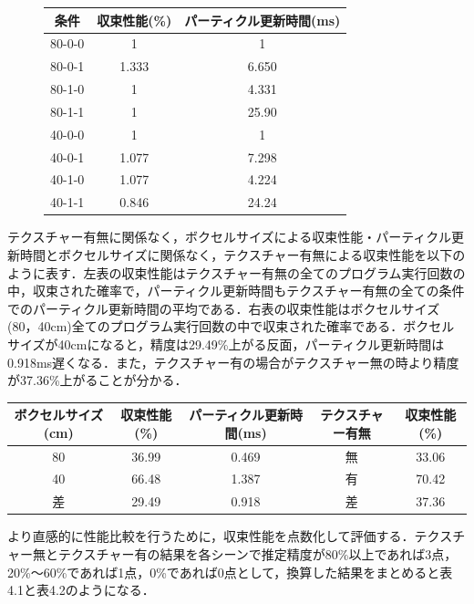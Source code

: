 %
\begin{figure}[htbp]
\begin{center}
\begin{tabular}{ccc} \hline
条件 & 収束性能(\%) &  パーティクル更新時間(ms)\\ \hline \hline
80-0-0 & 1 & 1\\ \hline
80-0-1 & 1.333 & 6.650\\ \hline
80-1-0 & 1 & 4.331\\ \hline
80-1-1 & 1 & 25.90\\ \hline \hline
40-0-0 & 1 & 1\\ \hline
40-0-1 & 1.077 & 7.298\\ \hline
40-1-0 & 1.077 & 4.224\\ \hline
40-1-1 & 0.846 & 24.24\\ \hline
\end{tabular}
\end{center}
\end{figure}
%

テクスチャー有無に関係なく，ボクセルサイズによる収束性能・パーティクル更新時間とボクセルサイズに関係なく，テクスチャー有無による収束性能を以下のように表す．左表の収束性能はテクスチャー有無の全てのプログラム実行回数の中，収束された確率で，パーティクル更新時間もテクスチャー有無の全ての条件でのパーティクル更新時間の平均である．右表の収束性能はボクセルサイズ(80，40cm)全てのプログラム実行回数の中で収束された確率である．ボクセルサイズが40cmになると，精度は29.49\%上がる反面，パーティクル更新時間は0.918ms遅くなる．また，テクスチャー有の場合がテクスチャー無の時より精度が37.36\%上がることが分かる．

\begin{table}[htbp]
\begin{center}
\begin{tabular}{|ccc||cc|} \hline
ボクセルサイズ(cm) & 収束性能(\%) &  パーティクル更新時間(ms) & テクスチャー有無 & 収束性能(\%)\\ \hline \hline
80 & 36.99 & 0.469 & 無 & 33.06\\ \hline
40 & 66.48 & 1.387 & 有 & 70.42\\ \hline
差 & 29.49 & 0.918 & 差 & 37.36\\ \hline
\end{tabular}
\end{center}
\end{table}

\newpage

より直感的に性能比較を行うために，収束性能を点数化して評価する．テクスチャー無とテクスチャー有の結果を各シーンで推定精度が80\%以上であれば3点，20\%～60\%であれば1点，0\%であれば0点として，換算した結果をまとめると表4.1と表4.2のようになる．

